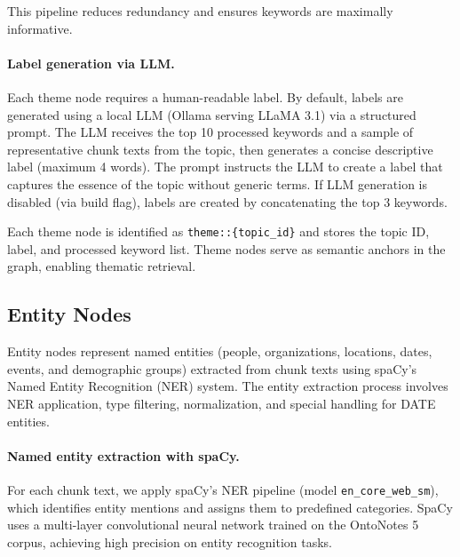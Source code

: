 \documentclass[10pt]{article}
\begin{document}
This pipeline reduces redundancy and ensures keywords are maximally informative.

\paragraph{Label generation via LLM.} Each theme node requires a human-readable label. By default, labels are generated using a local LLM (Ollama serving LLaMA 3.1) via a structured prompt. The LLM receives the top 10 processed keywords and a sample of representative chunk texts from the topic, then generates a concise descriptive label (maximum 4 words). The prompt instructs the LLM to create a label that captures the essence of the topic without generic terms. If LLM generation is disabled (via build flag), labels are created by concatenating the top 3 keywords.

Each theme node is identified as \texttt{theme::\{topic\_id\}} and stores the topic ID, label, and processed keyword list. Theme nodes serve as semantic anchors in the graph, enabling thematic retrieval.

\subsection{Entity Nodes}

Entity nodes represent named entities (people, organizations, locations, dates, events, and demographic groups) extracted from chunk texts using spaCy's Named Entity Recognition (NER) system. The entity extraction process involves NER application, type filtering, normalization, and special handling for DATE entities.

\paragraph{Named entity extraction with spaCy.} For each chunk text, we apply spaCy's NER pipeline (model \texttt{en\_core\_web\_sm}), which identifies entity mentions and assigns them to predefined categories. SpaCy uses a multi-layer convolutional neural network trained on the OntoNotes 5 corpus, achieving high precision on entity recognition tasks.
\end{document}
